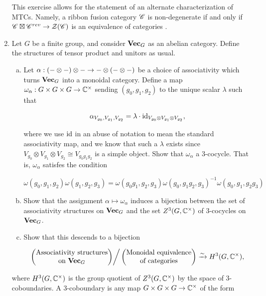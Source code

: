 \documentclass{article}
\theoremstyle{definition}
\numberwithin{figure}{section}
\begin{document}
\begin{enumerate}[\thesection .1.]
This exercise allows for the statement of an alternate characterization of MTCs. Namely, a ribbon fusion category $\mathscr{C}$ is non-degenerate if and only if $\mathscr{C}\boxtimes \mathscr{C}^{rev}\to \mathcal{Z}(\mathscr{C})$ is an equivalence of categories \cite[8.20.12]{etingof2016tensor}.

\item Let $G$ be a finite group, and consider $\bold{Vec}_G$ as an abelian category. Define the structures of tensor product and unitors as usual.

\begin{enumerate}[(a)]
\item Let $\alpha: (\-- \otimes \--)\otimes \--\to \--\otimes(\--\otimes\--)$ be a choice of associativity which turns $\bold{Vec}_G$ into a monoidal category. Define a map $\omega_\alpha: G\times G\times G\to \mathbb{C}^\times$ sending $(g_0,g_1,g_2)$ to the unique scalar $\lambda$ such that

$$\alpha_{V_{g_0},V_{g_1},V_{g_2}}=\lambda \cdot \mathrm{id}_{V_{g_0}\otimes V_{g_1}\otimes V_{g_2}},$$

where we use $\mathrm{id}$ in an abuse of notation to mean the standard associativity map, and we know that such a $\lambda$ exists since $V_{g_0}\otimes V_{g_1}\otimes V_{g_2}\cong V_{g_0g_1g_2}$ is a simple object. Show that $\omega_{\alpha}$ a $3$-cocycle. That is, $\omega_{\alpha}$ satisfes the condition

$$\omega(g_0,g_1,g_2)\omega(g_1,g_2,g_3)=\omega(g_0g_1,g_2,g_3)\omega(g_0,g_1g_2,g_3)^{-1}\omega(g_0,g_1,g_2g_3)$$

\item Show that the assignment $\alpha\mapsto \omega_{\alpha}$ induces a bijection between the set of associativity structures on $\bold{Vec}_G$ and the set $Z^3(G,\mathbb{C}^\times)$ of $3$-cocycles on $\bold{Vec}_G$.

\item Show that this descends to a bijection

$$
\left.\begin{pmatrix} \text{Associativity structures}\\
\text{on }\bold{Vec}_G
\end{pmatrix}\right/
\begin{pmatrix}
\text{Monoidal equivalence}\\
\text{of categories}
\end{pmatrix}\xrightarrow{\sim}H^3(G,\mathbb{C}^\times),$$
\end{enumerate}

where $H^3(G,\mathbb{C}^\times)$ is the group quotient of $Z^3(G,\mathbb{C}^\times)$ by the space of $3$-coboundaries. A $3$-coboundary is any map $G\times G\times G\to \mathbb{C}^\times$ of the form


\end{enumerate}
\end{document}
